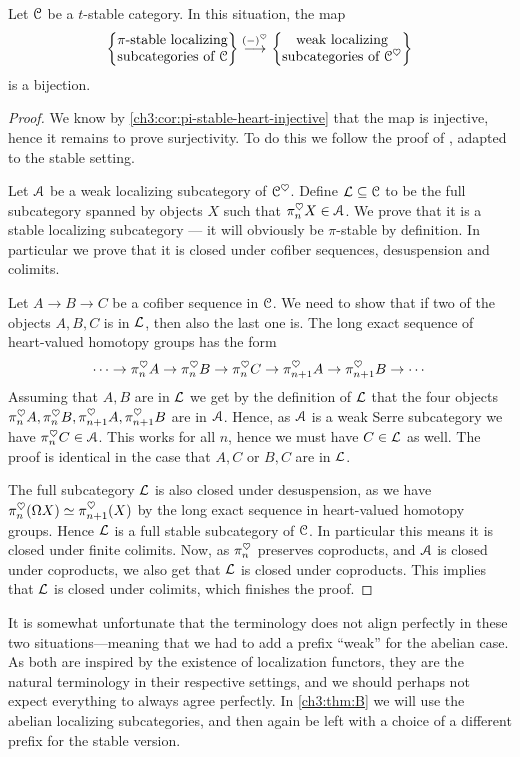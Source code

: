 \begin{theorem}
    \label{ch3:thm:premain}
    Let $\EuScript{C}$ be a $t$-stable category. In this situation, the map 
    \[\left\{ \begin{matrix} \pi\text{-stable localizing}\\ \text{subcategories of }\EuScript{C} \end{matrix} \right\}\overset{(-)^\heartsuit}{\longrightarrow} \left\{ \begin{matrix} \text{weak localizing}\\ \text{subcategories of }\EuScript{C}^\heartsuit \end{matrix} \right\}\] 
    is a bijection. 
\end{theorem}
\begin{proof}
    We know by \cref{ch3:cor:pi-stable-heart-injective} that the map is injective, hence it remains to prove surjectivity. To do this we follow the proof of \cite[C.5.2.7]{lurie_SAG}, adapted to the stable setting. 
    
    Let $\EuScript{A}$ be a weak localizing subcategory of $\EuScript{C}^\heartsuit$. Define $\mathcal{L}\subseteq \EuScript{C}$ to be the full subcategory spanned by objects $X$ such that $\pi_n^\heartsuit X\in \EuScript{A}$. We prove that it is a stable localizing subcategory --- it will obviously be $\pi$-stable by definition. In particular we prove that it is closed under cofiber sequences, desuspension and colimits. 

    Let $A\rightarrow B\rightarrow C$ be a cofiber sequence in $\EuScript{C}$. We need to show that if two of the objects $A, B, C$ is in $\mathcal{L}$, then also the last one is. The long exact sequence of heart-valued homotopy groups has the form 
    \[\cdots\rightarrow \pi^{\heartsuit}_{n}A \rightarrow \pi^{\heartsuit}_{n}B \rightarrow \pi^{\heartsuit}_{n}C \rightarrow \pi^{\heartsuit}_{n+1}A\rightarrow \pi^{\heartsuit}_{n+1}B \rightarrow \cdots \]
    Assuming that $A, B$ are in $\mathcal{L}$ we get by the definition of $\mathcal{L}$ that the four objects $\pi^{\heartsuit}_{n}A, \pi^{\heartsuit}_{n}B, \pi^{\heartsuit}_{n+1}A, \pi^{\heartsuit}_{n+1}B$ are in $\EuScript{A}$. Hence, as $\EuScript{A}$ is a weak Serre subcategory we have $\pi^\heartsuit_n C\in \EuScript{A}$. This works for all $n$, hence we must have $C\in \mathcal{L}$ as well. The proof is identical in the case that $A, C$ or $B, C$ are in $\mathcal{L}$. 
    
    The full subcategory $\mathcal{L}$ is also closed under desuspension, as we have $\pi_n^\heartsuit (\Omega X)\simeq \pi_{n+1}^\heartsuit(X)$ by the long exact sequence in heart-valued homotopy groups. Hence $\mathcal{L}$ is a full stable subcategory of $\EuScript{C}$. In particular this means it is closed under finite colimits. Now, as $\pi_n^\heartsuit$ preserves coproducts, and $\EuScript{A}$ is closed under coproducts, we also get that $\mathcal{L}$ is closed under coproducts. This implies that $\mathcal{L}$ is closed under colimits, which finishes the proof. 
\end{proof}

\begin{remark}
    It is somewhat unfortunate that the terminology does not align perfectly in these two situations---meaning that we had to add a prefix ``weak'' for the abelian case. As both are inspired by the existence of localization functors, they are the natural terminology in their respective settings, and we should perhaps not expect everything to always agree perfectly. In \cref{ch3:thm:B} we will use the abelian localizing subcategories, and then again be left with a choice of a different prefix for the stable version. 
\end{remark}

